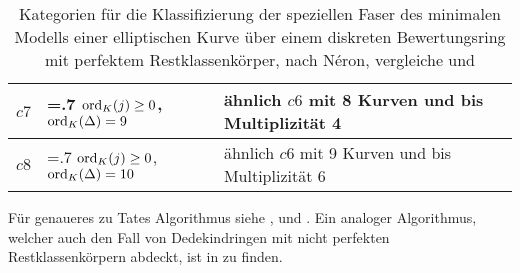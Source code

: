 \begin{table}[tbhp]
\begin{center}
\begin{tabularx}{\linewidth}{@{}l>{\hsize=.7\hsize}X>{\hsize=1.3\hsize}X@{}}
      $c7$& $\operatorname{ord}_{K}(j)\geq0$, $\operatorname{ord}_{K}(\Delta)=9$
      & ähnlich $c6$ mit 8 Kurven und bis Multiplizität 4 \\\midrule
      $c8$& $\operatorname{ord}_{K}(j)\geq0$, $\operatorname{ord}_{K}(\Delta)=10$
      & ähnlich $c6$ mit 9 Kurven und bis Multiplizität 6\\\bottomrule
    \end{tabularx}
  \end{center}
  \caption{Kategorien für die
    Klassifizierung der speziellen Faser des minimalen Modells einer
    elliptischen Kurve über einem diskreten Bewertungsring mit
    perfektem Restklassenkörper,
    nach Néron,
    vergleiche \cite[Chapter~1.5]{neron} und
    \cite[Figure~IV.4.4]{silverman2}
    \label{tab:faserklassifizierung}} 
\end{table}
Für genaueres zu Tates Algorithmus siehe
\cite[Chapter~IV.9]{silverman2},
\cite[Chapter~1.5]{neron} und \cite{tate}.
Ein analoger Algorithmus, welcher auch den Fall von Dedekindringen mit
nicht perfekten Restklassenkörpern abdeckt, ist in \cite{nonperfect}
zu finden.


